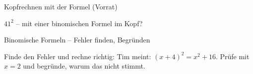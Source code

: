 \begin{aufgabe}{Kopfrechnen mit der Formel (Vorrat)}
\begin{teile}
\teil $41^2$ – mit einer binomischen Formel im Kopf? \leerfeld
\end{teile}
\end{aufgabe}

\begin{aufgabe}{Binomische Formeln – Fehler finden, Begründen}
\begin{teile}
\teil Finde den Fehler und rechne richtig: 
\teil Tim meint: $(x + 4)^2 = x^2 + 16$. Prüfe mit $x = 2$ und begründe, warum das nicht stimmt.
\end{teile}
\end{aufgabe}
